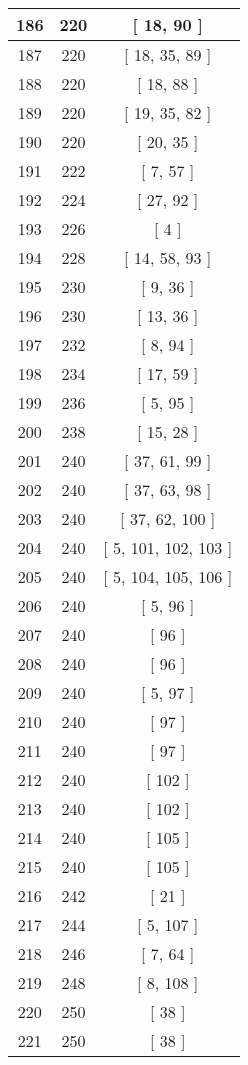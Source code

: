 \begin{center}
\begin{longtable}[H]{|| c c c ||}
\\\hline
186 & 220 & [ 18, 90 ]
\\\hline
187 & 220 & [ 18, 35, 89 ]
\\\hline
188 & 220 & [ 18, 88 ]
\\\hline
189 & 220 & [ 19, 35, 82 ]
\\\hline
190 & 220 & [ 20, 35 ]
\\\hline
191 & 222 & [ 7, 57 ]
\\\hline
192 & 224 & [ 27, 92 ]
\\\hline
193 & 226 & [ 4 ]
\\\hline
194 & 228 & [ 14, 58, 93 ]
\\\hline
195 & 230 & [ 9, 36 ]
\\\hline
196 & 230 & [ 13, 36 ]
\\\hline
197 & 232 & [ 8, 94 ]
\\\hline
198 & 234 & [ 17, 59 ]
\\\hline
199 & 236 & [ 5, 95 ]
\\\hline
200 & 238 & [ 15, 28 ]
\\\hline
201 & 240 & [ 37, 61, 99 ]
\\\hline
202 & 240 & [ 37, 63, 98 ]
\\\hline
203 & 240 & [ 37, 62, 100 ]
\\\hline
204 & 240 & [ 5, 101, 102, 103 ]
\\\hline
205 & 240 & [ 5, 104, 105, 106 ]
\\\hline
206 & 240 & [ 5, 96 ]
\\\hline
207 & 240 & [ 96 ]
\\\hline
208 & 240 & [ 96 ]
\\\hline
209 & 240 & [ 5, 97 ]
\\\hline
210 & 240 & [ 97 ]
\\\hline
211 & 240 & [ 97 ]
\\\hline
212 & 240 & [ 102 ]
\\\hline
213 & 240 & [ 102 ]
\\\hline
214 & 240 & [ 105 ]
\\\hline
215 & 240 & [ 105 ]
\\\hline
216 & 242 & [ 21 ]
\\\hline
217 & 244 & [ 5, 107 ]
\\\hline
218 & 246 & [ 7, 64 ]
\\\hline
219 & 248 & [ 8, 108 ]
\\\hline
220 & 250 & [ 38 ]
\\\hline
221 & 250 & [ 38 ]
\\\hline

\end{longtable}
\end{center}
